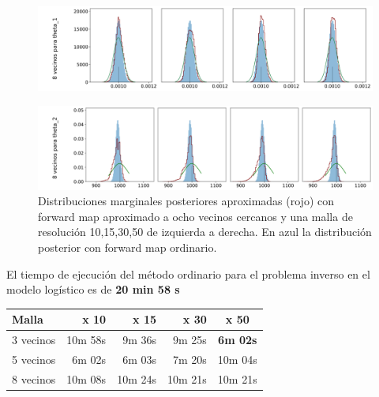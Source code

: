 \begin{figure}[H] 
    \centering 
    \includegraphics[width = 16 cm ]{img/Exp_Central_logistico_Sigma/Figuras/Generales/Convergencia_theta1_3_logistico_sigma.png} 
\end{figure} 
\begin{figure}[H] 
    \centering 
    \includegraphics[width = 16 cm ]{img/Exp_Central_logistico_Sigma/Figuras/Generales/Convergencia_theta2_3_logistico_sigma.png} 
    \caption{Distribuciones marginales posteriores aproximadas (rojo) con forward map aproximado a ocho vecinos cercanos y una malla de resolución 10,15,30,50 de izquierda a derecha. En azul la distribución posterior con forward map ordinario.}
    \label{Fig. Aprox log 8v}
\end{figure} 

El tiempo de ejecución del método ordinario para el problema inverso en el modelo logístico es de \textbf{20 min 58 s}

\begin{table}[H]
    \centering
    \begin{tabular}{l r r r c}
      \toprule
       \textbf{Malla} & \textbf{\:\:\:\:\:\:\:10 x 10\:\:\:\:\:\:\:} & \textbf{\:\:\:\:\:\:\:15 x 15\:\:\:\:\:\:\:} & \textbf{\:\:\:\:\:\:\:30 x 30\:\:\:\:\:\:\:} & \textbf{\:\:\:\:\:\:\:50 x 50\:\:\:\:\:\:\:} \\
      \midrule
      3 vecinos & 10m 58s & 9m 36s & 9m 25s & \textbf{6m 02s}\\
      5 vecinos & 6m 02s & 6m 03s & 7m 20s & 10m 04s\\
      8 vecinos & 10m 08s & 10m 24s & 10m 21s & 10m 21s\\
      \bottomrule
    \end{tabular}
\end{table}

